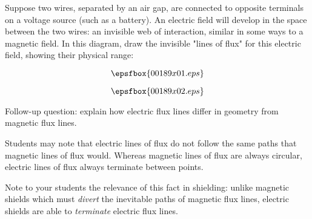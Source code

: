 

Suppose two wires, separated by an air gap, are connected to opposite terminals on a voltage source (such as a battery).  An electric field will develop in the space between the two wires: an invisible web of interaction, similar in some ways to a magnetic field.  In this diagram, draw the invisible "lines of flux" for this electric field, showing their physical range:

$$\epsfbox{00189x01.eps}$$







$$\epsfbox{00189x02.eps}$$

\vskip 10pt

Follow-up question: explain how electric flux lines differ in geometry from magnetic flux lines.







Students may note that electric lines of flux do not follow the same paths that magnetic lines of flux would.  Whereas magnetic lines of flux are always circular, electric lines of flux always terminate between points.

Note to your students the relevance of this fact in shielding: unlike magnetic shields which must {\it divert} the inevitable paths of magnetic flux lines, electric shields are able to {\it terminate} electric flux lines.




